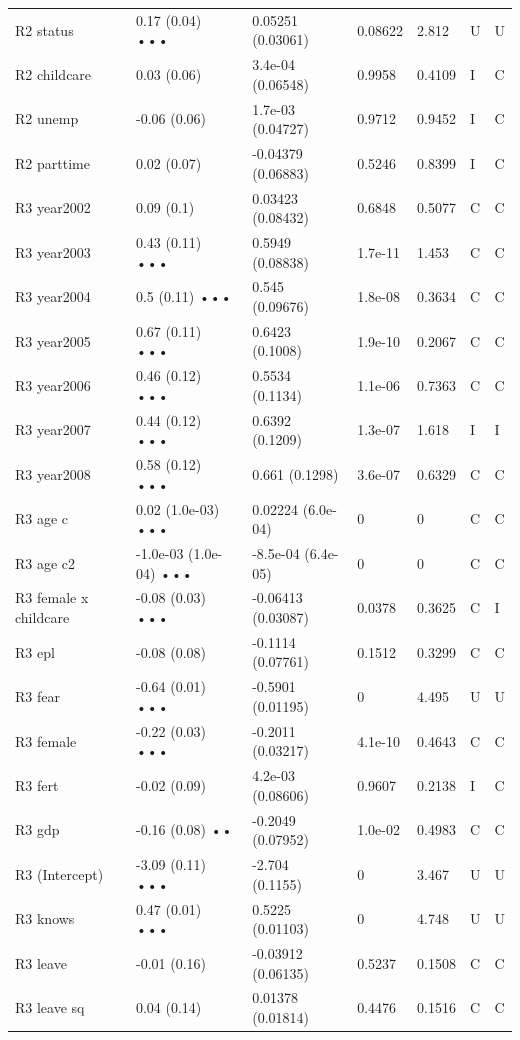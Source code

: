 {\begin{longtable}{@{}p{.245\linewidth}p{.17\linewidth}p{.17\linewidth}p{.085\linewidth}p{.060\linewidth}p{.08\linewidth}p{.07\linewidth}@{}}
R2 status & 0.17 (0.04) ••• & 0.05251 (0.03061) & 0.08622 & 2.812 & U & U\\
R2 childcare & 0.03 (0.06) & 3.4e-04 (0.06548) & 0.9958 & 0.4109 & I & C\\
R2 unemp & -0.06 (0.06) & 1.7e-03 (0.04727) & 0.9712 & 0.9452 & I & C\\
R2 parttime & 0.02 (0.07) & -0.04379 (0.06883) & 0.5246 & 0.8399 & I & C\\
R3 year2002 & 0.09 (0.1) & 0.03423 (0.08432) & 0.6848 & 0.5077 & C & C\\
R3 year2003 & 0.43 (0.11) ••• & 0.5949 (0.08838) & 1.7e-11 & 1.453 & C & C\\
R3 year2004 & 0.5 (0.11) ••• & 0.545 (0.09676) & 1.8e-08 & 0.3634 & C & C\\
R3 year2005 & 0.67 (0.11) ••• & 0.6423 (0.1008) & 1.9e-10 & 0.2067 & C & C\\
R3 year2006 & 0.46 (0.12) ••• & 0.5534 (0.1134) & 1.1e-06 & 0.7363 & C & C\\
R3 year2007 & 0.44 (0.12) ••• & 0.6392 (0.1209) & 1.3e-07 & 1.618 & I & I\\
R3 year2008 & 0.58 (0.12) ••• & 0.661 (0.1298) & 3.6e-07 & 0.6329 & C & C\\
R3 age c & 0.02 (1.0e-03) ••• & 0.02224 (6.0e-04) & 0 & 0 & C & C\\
R3 age c2 & -1.0e-03 (1.0e-04) ••• & -8.5e-04 (6.4e-05) & 0 & 0 & C & C\\
R3 female x childcare & -0.08 (0.03) ••• & -0.06413 (0.03087) & 0.0378 & 0.3625 & C & I\\
R3 epl & -0.08 (0.08) & -0.1114 (0.07761) & 0.1512 & 0.3299 & C & C\\
R3 fear & -0.64 (0.01) ••• & -0.5901 (0.01195) & 0 & 4.495 & U & U\\
R3 female & -0.22 (0.03) ••• & -0.2011 (0.03217) & 4.1e-10 & 0.4643 & C & C\\
R3 fert & -0.02 (0.09) & 4.2e-03 (0.08606) & 0.9607 & 0.2138 & I & C\\
R3 gdp & -0.16 (0.08) •• & -0.2049 (0.07952) & 1.0e-02 & 0.4983 & C & C\\
R3 (Intercept) & -3.09 (0.11) ••• & -2.704 (0.1155) & 0 & 3.467 & U & U\\
R3 knows & 0.47 (0.01) ••• & 0.5225 (0.01103) & 0 & 4.748 & U & U\\
R3 leave & -0.01 (0.16) & -0.03912 (0.06135) & 0.5237 & 0.1508 & C & C\\
R3 leave sq & 0.04 (0.14) & 0.01378 (0.01814) & 0.4476 & 0.1516 & C & C\\

\end{longtable}}
